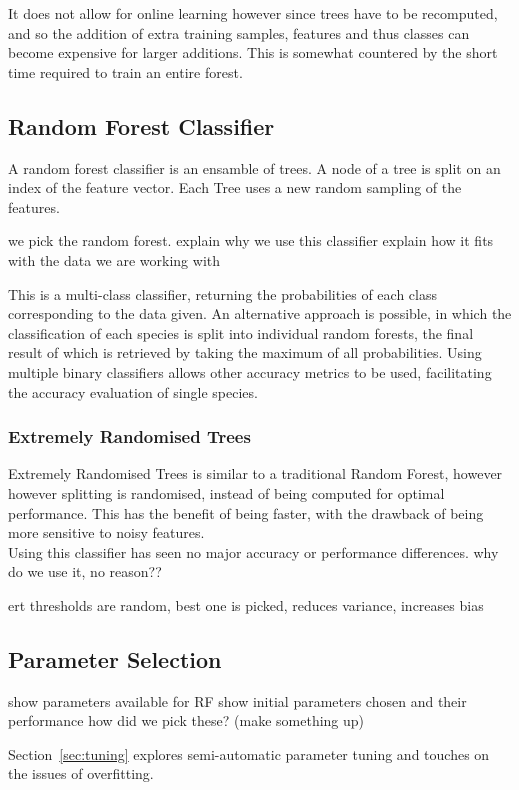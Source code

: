 It does not allow for online learning however since trees have to be recomputed, 
and so the addition of extra training samples, features and thus classes can
become expensive for larger additions.
This is somewhat countered by the short time required to train an entire forest.


\subsection{Random Forest Classifier}
A random forest classifier is an ensamble of trees.
A node of a tree is split on an index of the feature vector.
Each Tree uses a new random sampling of the features.

we pick the random forest.
explain why we use this classifier
explain how it fits with the data we are working with

This is a multi-class classifier, returning the probabilities of each class
corresponding to the data given.
An alternative approach is possible, in which the classification of each species
is split into individual random forests, the final result of which is retrieved
by taking the maximum of all probabilities.
Using multiple binary classifiers allows other accuracy metrics to be used,
facilitating the accuracy evaluation of single species.

\subsubsection{Extremely Randomised Trees}
Extremely Randomised Trees is similar to a traditional Random Forest, however
however splitting is randomised, instead of being computed for optimal
performance.
This has the benefit of being faster, with the drawback of being more sensitive
to noisy features.\\

Using this classifier has seen no major accuracy or performance differences.
why do we use it, no reason??

ert thresholds are random, best one is picked, reduces variance, increases bias

\subsection{Parameter Selection}
show parameters available for RF
show initial parameters chosen and their performance
how did we pick these? (make something up)

Section~\ref{sec:tuning} explores semi-automatic parameter tuning and touches on
the issues of overfitting.
